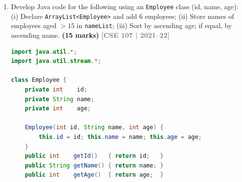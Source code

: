 \documentclass[12pt,a3paper]{article}
\newcommand{\yr}[1]{\hfill\textcolor{gray}{\small\textbf{[#1]}}}
\newcommand{\mk}[1]{\textcolor{orange!70!black}{\small\textbf{(#1 marks)}}}
\begin{document}
\begin{enumerate}
\begin{tcolorbox}[enhanced,breakable,ansbox,
  colback=cH!4,colframe=cH,boxrule=0.8pt,arc=5pt,
  title={\textbf{Answer — Employee Stream Rewrite and
  Sort}},
  fonttitle=\bfseries\color{white},colbacktitle=cH]
\begin{lstlisting}[language=Java]
        // -- Segment 2 (original for-each loop) -----------
        List<Employee> filtered1 = new ArrayList<>();
        for (Employee e : list)
            if (e.getAge() <= 20) filtered1.add(e);

        // (ii-b) Segment 2 using Stream
        List<Employee> filtered2 = list.stream()
            .filter(e -> e.getAge() <= 20)
            .collect(Collectors.toList());

        System.out.println("Age <= 20: " + filtered2);

        // (iii) Sort: ascending age, then ascending name
        list.sort(Comparator.comparingInt(Employee::getAge)
                            .thenComparing(Employee::getName));

        System.out.println("Sorted: " + list);
    }
}
\end{lstlisting}

\textbf{Output:}
\begin{verbatim}
All names: [Alice, Bob, Carol, Dave, Eve, Frank]
Age <= 20: [Bob, Carol, Dave, Eve]
Sorted: [5:Eve(17), 2:Bob(19), 3:Carol(20), 4:Dave(20),
         1:Alice(22), 6:Frank(25)]
\end{verbatim}

\end{tcolorbox}


\item Develop Java code for the following using an \texttt{Employee} class (id, name, age): (i) Declare \texttt{ArrayList<Employee>} and add 6 employees; (ii) Store names of employees aged $> 15$ in \texttt{nameList}; (iii) Sort by ascending age; if equal, by ascending name. \mk{15}
\yr{CSE 107 | 2021--22}

\begin{tcolorbox}[enhanced,breakable,ansbox,
  colback=cH!4,colframe=cH,boxrule=0.8pt,arc=5pt,
  title={\textbf{Answer — Employee ArrayList, Filter
  and Sort}},
  fonttitle=\bfseries\color{white},colbacktitle=cH]

\begin{lstlisting}[language=Java]
import java.util.*;
import java.util.stream.*;

class Employee {
    private int    id;
    private String name;
    private int    age;

    Employee(int id, String name, int age) {
        this.id = id; this.name = name; this.age = age;
    }
    public int    getId()   { return id;   }
    public String getName() { return name; }
    public int    getAge()  { return age;  }


\end{lstlisting}
\end{tcolorbox}
\end{enumerate}
\end{document}
